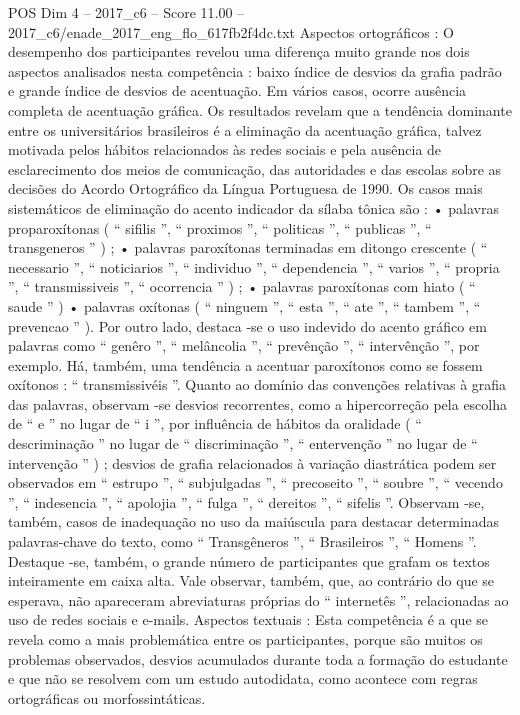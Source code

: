 \begin{textsample}{POS Dim 4 – 2017\_c6 – Score 11.00 – 2017\_c6/enade\_2017\_eng\_flo\_617fb2f4dc.txt}
Aspectos ortográficos : O desempenho dos participantes revelou uma diferença muito grande nos dois aspectos analisados nesta competência : baixo índice de desvios da grafia padrão e grande índice de desvios de acentuação.
Em vários casos, ocorre ausência completa de acentuação gráfica.
Os resultados revelam que a tendência dominante entre os universitários brasileiros é a eliminação da acentuação gráfica, talvez motivada pelos hábitos relacionados às redes sociais e pela ausência de esclarecimento dos meios de comunicação, das autoridades e das escolas sobre as decisões do Acordo Ortográfico da Língua Portuguesa de 1990.
Os casos mais sistemáticos de eliminação do acento indicador da sílaba tônica são : • palavras proparoxítonas ( “ sifilis ”, “ proximos ”, “ politicas ”, “ publicas ”, “ transgeneros ” ) ; • palavras paroxítonas terminadas em ditongo crescente ( “ necessario ”, “ noticiarios ”, “ individuo ”, “ dependencia ”, “ varios ”, “ propria ”, “ transmissiveis ”, “ ocorrencia ” ) ; • palavras paroxítonas com hiato ( “ saude ” ) • palavras oxítonas ( “ ninguem ”, “ esta ”, “ ate ”, “ tambem ”, “ prevencao ” ).
Por outro lado, destaca -se o uso indevido do acento gráfico em palavras como “ genêro ”, “ melâncolia ”, “ prevênção ”, “ intervênção ”, por exemplo.
Há, também, uma tendência a acentuar paroxítonos como se fossem oxítonos : “ transmissivéis ”.
Quanto ao domínio das convenções relativas à grafia das palavras, observam -se desvios recorrentes, como a hipercorreção pela escolha de “ e ” no lugar de “ i ”, por influência de hábitos da oralidade ( “ descriminação ” no lugar de “ discriminação ”, “ entervenção ” no lugar de “ intervenção ” ) ; desvios de grafia relacionados à variação diastrática podem ser observados em “ estrupo ”, “ subjulgadas ”, “ precoseito ”, “ soubre ”, “ vecendo ”, “ indesencia ”, “ apolojia ”, “ fulga ”, “ dereitos ”, “ sifelis ”.
Observam -se, também, casos de inadequação no uso da maiúscula para destacar determinadas palavras-chave do texto, como “ Transgêneros ”, “ Brasileiros ”, “ Homens ”.
Destaque -se, também, o grande número de participantes que grafam os textos inteiramente em caixa alta.
Vale observar, também, que, ao contrário do que se esperava, não apareceram abreviaturas próprias do “ internetês ”, relacionadas ao uso de redes sociais e e-mails.
Aspectos textuais : Esta competência é a que se revela como a mais problemática entre os participantes, porque são muitos os problemas observados, desvios acumulados durante toda a formação do estudante e que não se resolvem com um estudo autodidata, como acontece com regras ortográficas ou morfossintáticas.

\end{textsample}
